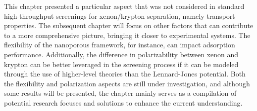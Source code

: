 \documentclass[main]{subfiles}
\begin{document}
This chapter presented a particular aspect that was not considered in standard high-throughput screenings for xenon/krypton separation, namely transport properties. The subsequent chapter will focus on other factors that can contribute to a more comprehensive picture, bringing it closer to experimental systems. The flexibility of the nanoporous framework, for instance, can impact adsorption performance.\autocite{Witman_2017} Additionally, the difference in polarizability between xenon and krypton can be better leveraged in the screening process if it can be modeled through the use of higher-level theories than the Lennard-Jones potential. Both the flexibility and polarization aspects are still under investigation, and although some results will be presented, the chapter mainly serves as a compilation of potential research focuses and solutions to enhance the current understanding.

\OnlyInSubfile{\printglobalbibliography}
\end{document}
